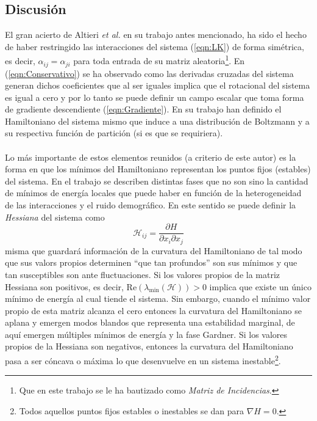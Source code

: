 \subsection{Discusión}

El gran acierto de Altieri \textit{et al.} en su trabajo antes mencionado, ha sido el hecho de haber restringido las interacciones del sistema (\ref{eqn:LK}) de forma simétrica, es decir, $\alpha_{ij}=\alpha_{ji}$ para toda entrada de su matriz aleatoria\footnote{Que en este trabajo se le ha bautizado como \textit{Matriz de Incidencias}.}. En (\ref{eqn:Conservativo}) se ha observado como las derivadas cruzadas del sistema generan dichos coeficientes que al ser iguales implica que el rotacional del sistema es igual a cero y por lo tanto se puede definir un campo escalar que toma forma de gradiente descendiente (\ref{eqn:Gradiente}). En su trabajo han definido el Hamiltoniano del sistema mismo que induce a una distribución de Boltzmann y a su respectiva función de partición (si es que se requiriera). \\
\\
Lo más importante de estos elementos reunidos (a criterio de este autor) es la forma en que los mínimos del Hamiltoniano representan los puntos fijos (estables) del sistema. En el trabajo se describen distintas fases que no son sino la cantidad de mínimos de energía locales que puede haber en función de la heterogeneidad de las interacciones y el ruido demográfico. En este sentido se puede definir la \textit{Hessiana} del sistema como
\begin{equation}\label{eqn:Hessiana}
	\mathcal{H}_{ij} = \frac{\partial H}{\partial x_i\partial x_j}
\end{equation}
misma que guardará información de la curvatura del Hamiltoniano de tal modo que sus valors propios determinen ``que tan profundos'' son sus mínimos y que tan susceptibles son ante fluctuaciones. Si los valores propios de la matriz Hessiana son positivos, es decir, Re$(\lambda_{\min}(\mathcal{H}))>0$ implica que existe un único mínimo de energía al cual tiende el sistema. Sin embargo, cuando el mínimo valor propio de esta matriz alcanza el cero entonces la curvatura del Hamiltoniano se aplana y emergen modos blandos que representa una estabilidad marginal, de aquí emergen múltiples mínimos de energía y la fase Gardner. Si los valores propios de la Hessiana son negativos, entonces la curvatura del Hamiltoniano pasa a ser cóncava o máxima lo que desenvuelve en un sistema inestable\footnote{Todos aquellos puntos fijos estables o inestables se dan para $\nabla H=0$.}. \\
